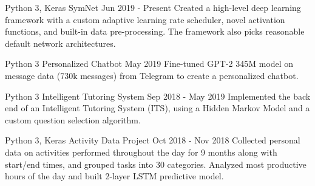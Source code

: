 
  \cventry
    {Python 3, Keras} %
    {SymNet} %
    {} %
    {Jun 2019 - Present} %
    {
      Created a high-level deep learning framework with a custom adaptive learning rate scheduler, novel activation functions, and built-in data pre-processing. The framework also picks reasonable default network architectures.
    }
    
  \cventry
    {Python 3} %
    {Personalized Chatbot} %
    {} %
    {May 2019} %
    {
      Fine-tuned GPT-2 345M model on message data (730k messages) from Telegram to create a personalized chatbot.
    }

  \cventry
    {Python 3} %
    {Intelligent Tutoring System} %
    {} %
    {Sep 2018 - May 2019} %
    {
      Implemented the back end of an Intelligent Tutoring System (ITS), using a Hidden Markov Model and a custom question selection algorithm.
    }

  \cventry
    {Python 3, Keras} %
    {Activity Data Project} %
    {} %
    {Oct 2018 - Nov 2018} %
    {
      Collected personal data on activities performed throughout the day for 9 months along with start/end times, and grouped tasks into 30 categories. Analyzed most productive hours of the day and built 2-layer LSTM predictive model.
    }
